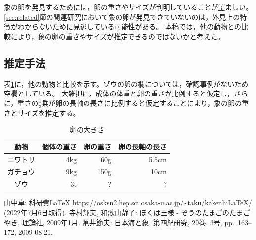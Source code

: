 \documentclass[dvipdfmx]{jsarticle}
\begin{document}
象の卵を発見するためには，卵の重さやサイズが判明していることが望ましい。
\ref{sec:related}節の関連研究において象の卵が発見できていないのは，外見上の特徴がわからないために見逃している可能性がある。 %
本稿では，他の動物との比較により，象の卵の重さやサイズが推定できるのではないかと考えた。

\subsection{推定手法}

表\ref{tab:egg_sizes}に，他の動物と比較を示す。ゾウの卵の欄については，確認事例がないため空欄としている。
大雑把に，成体の体重と卵の重さが比例すると仮定し，さらに，重さの$\frac{1}{3}$乗が卵の長軸の長さに比例すると仮定することにより，象の卵の重さとサイズを推定する。

\begin{table}[htbp]
	\centering
	\caption{卵の大きさ}
  \label{tab:egg_sizes}
	\begin{tabular}{|c|r|r|r|}
		\hline
		動物 & 個体の重さ & 卵の重さ & 卵の長軸の長さ \\ \hline \hline
		ニワトリ & 4kg & 60g & 5.5cm \\ \hline
		ガチョウ & 9kg & 150g & 10cm \\ \hline
		ゾウ & 3t & ? & ? \\ \hline
	\end{tabular}
\end{table}

\begin{thebibliography}{99}
 山中卓: 科研費LaTeX \url{https://osksn2.hep.sci.osaka-u.ac.jp/~taku/kakenhiLaTeX/} (2022年7月6日取得). %
 寺村輝夫, 和歌山静子: ぼくは王様 - ぞうのたまごのたまごやき, 理論社, 2009年1月. %
 亀井節夫: 日本海と象, 第四紀研究, 29巻, 3号, pp.~163--172, 2009-08-21. %
\end{thebibliography}
\end{document}
